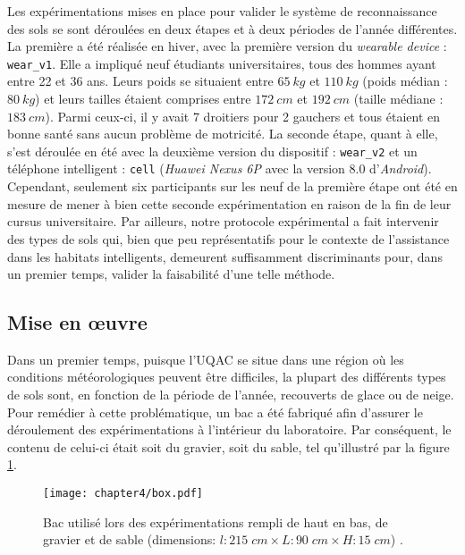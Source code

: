 Les expérimentations mises en place pour valider le système de reconnaissance des sols se sont déroulées en deux étapes et à deux périodes de l'année différentes. La première a été réalisée en hiver, avec la première version du \textit{wearable device} : \texttt{wear\_v1}. Elle a impliqué neuf étudiants universitaires, tous des hommes ayant entre 22 et 36 ans. Leurs poids se situaient entre $65\:kg$ et $110\:kg$ (poids médian : $80\:kg$) et leurs tailles étaient comprises entre $172\:cm$ et $192\:cm$ (taille médiane : $183\:cm$). Parmi ceux-ci, il y avait 7 droitiers pour 2 gauchers et tous étaient en bonne santé sans aucun problème de motricité. La seconde étape, quant à elle, s'est déroulée en été avec la deuxième version du dispositif : \texttt{wear\_v2} et un téléphone intelligent : \texttt{cell} (\textit{Huawei Nexus 6P} avec la version $8.0$ d'\textit{Android}). Cependant, seulement six participants sur les neuf de la première étape ont été en mesure de mener à bien cette seconde expérimentation en raison de la fin de leur cursus universitaire. Par ailleurs, notre protocole expérimental a fait intervenir des types de sols qui, bien que peu représentatifs pour le contexte de l'assistance dans les habitats intelligents, demeurent suffisamment discriminants pour, dans un premier temps, valider la faisabilité d'une telle méthode.

\subsection{Mise en \oe{}uvre}

Dans un premier temps, puisque l'\acs{UQAC} se situe dans une région où les conditions météorologiques peuvent être difficiles, la plupart des différents types de sols sont, en fonction de la période de l'année, recouverts de glace ou de neige. Pour remédier à cette problématique, un bac a été fabriqué afin d'assurer le déroulement des expérimentations à l'intérieur du laboratoire. Par conséquent, le contenu de celui-ci était soit du gravier, soit du sable, tel qu'illustré par la figure \ref{fig:box}.

\begin{figure}[H]
	\centering
	\texttt{[image: chapter4/box.pdf]}
        \caption[Bac utilisé lors des expérimentations rempli de haut en bas, de gravier et de sable (dimensions: $l : 215\; cm \times L : 90\; cm \times H : 15\; cm$).]{Bac utilisé lors des expérimentations rempli de haut en bas, de gravier et de sable (dimensions: $l : 215\; cm \times L : 90\; cm \times H : 15\; cm$) \citep{Thullier2017}.}
	\label{fig:box}
\end{figure}

